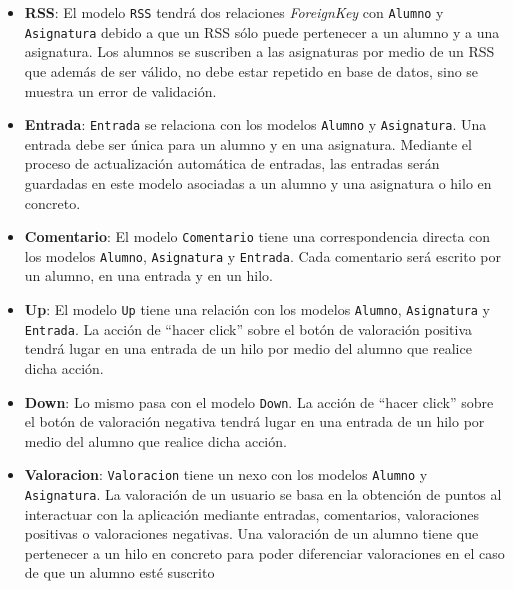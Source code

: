 \documentclass[a4paper, 12pt]{book}
\begin{document}
\begin{itemize}
  Para realizar la relaci\'on \texttt{Asignatura} - \texttt{Alumno} se ha utilizado un modelo intermedio \texttt{RSS} a trav\'es del argumento 
  \textit{Through}. Con este argumento, a la relaci\'on \textit{ManyToMany} se le est\'a se\~nalando que va a actuar un modelo intermediario. El modelo 
  intermediario se utilizar\'a para regular esta relaci\'on por lo que se pueden colocar campos adicionales en \texttt{RSS} para que \texttt{Asignatura}
  pueda acceder a m\'as datos relevantes de \texttt{Alumno}.
  \item {\bfseries RSS}: El modelo \texttt{RSS} tendr\'a dos relaciones \textit{ForeignKey} con \texttt{Alumno} y \texttt{Asignatura} debido
  a que un RSS s\'olo puede pertenecer a un alumno y a una asignatura. Los alumnos se suscriben a las asignaturas por medio de un RSS que adem\'as de 
  ser v\'alido, no debe estar repetido en base de datos, sino se muestra un error de validaci\'on.
  \item {\bfseries Entrada}: \texttt{Entrada} se relaciona con los modelos \texttt{Alumno} y \texttt{Asignatura}. Una entrada debe ser \'unica para un 
  alumno y en una asignatura. Mediante el proceso de actualizaci\'on autom\'atica de entradas, las entradas ser\'an guardadas en este modelo asociadas
  a un alumno y una asignatura o hilo en concreto.
  \item {\bfseries Comentario}: El modelo \texttt{Comentario} tiene una correspondencia directa con los modelos \texttt{Alumno}, \texttt{Asignatura} y 
  \texttt{Entrada}. Cada comentario ser\'a escrito por un alumno, en una entrada y en un hilo.
  \item {\bfseries Up}: El modelo \texttt{Up} tiene una relaci\'on con los modelos \texttt{Alumno}, \texttt{Asignatura} y \texttt{Entrada}. La acci\'on de 
  ``hacer click'' sobre el bot\'on de valoraci\'on positiva tendr\'a lugar en una entrada de un hilo por medio del alumno que realice dicha acci\'on.
  \item {\bfseries Down}: Lo mismo pasa con el modelo \texttt{Down}. La acci\'on de ``hacer click'' sobre el bot\'on de valoraci\'on negativa tendr\'a 
  lugar en una entrada de un hilo por medio del alumno que realice dicha acci\'on.
  \item {\bfseries Valoracion}: \texttt{Valoracion} tiene un nexo con los modelos \texttt{Alumno} y \texttt{Asignatura}. La valoraci\'on de un usuario se 
  basa en la obtenci\'on de puntos al interactuar con la aplicaci\'on mediante entradas, comentarios, valoraciones positivas o valoraciones negativas.
  Una valoraci\'on de un alumno tiene que pertenecer a un hilo en concreto para poder diferenciar valoraciones en el caso de que un alumno est\'e suscrito

\end{itemize}
\end{document}
